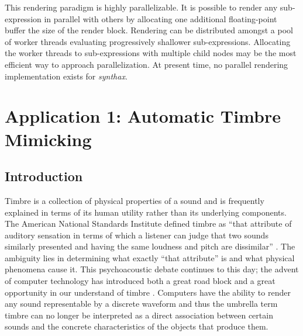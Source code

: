 \documentclass[12pt]{article}
\newcommand{\audiolanguagenamelower}{\emph{synthax}}
\begin{document}
This rendering paradigm is highly parallelizable. It is possible to render any sub-expression in parallel with others by allocating one additional floating-point buffer the size of the render block. Rendering can be distributed amongst a pool of worker threads evaluating progressively shallower sub-expressions. Allocating the worker threads to sub-expressions with multiple child nodes may be the most efficient way to approach parallelization. At present time, no parallel rendering implementation exists for \audiolanguagenamelower.




\section{Application 1: Automatic Timbre Mimicking}

\subsection{Introduction}\label{TMINTRO}
Timbre is a collection of physical properties of a sound and is frequently explained in terms of its human utility rather than its underlying components. The American National Standards Institute defined timbre as ``that attribute of auditory sensation in terms of which a listener can judge that two sounds similarly presented and having the same loudness and pitch are dissimilar'' \citep{american1960american}. The ambiguity lies in determining what exactly ``that attribute'' is and what physical phenomena cause it. This psychoacoustic debate continues to this day; the advent of computer technology has introduced both a great road block and a great opportunity in our understand of timbre \citep{erickson1975sound}. Computers have the ability to render any sound representable by a discrete waveform and thus the umbrella term timbre can no longer be interpreted as a direct association between certain sounds and the concrete characteristics of the objects that produce them.
\end{document}

